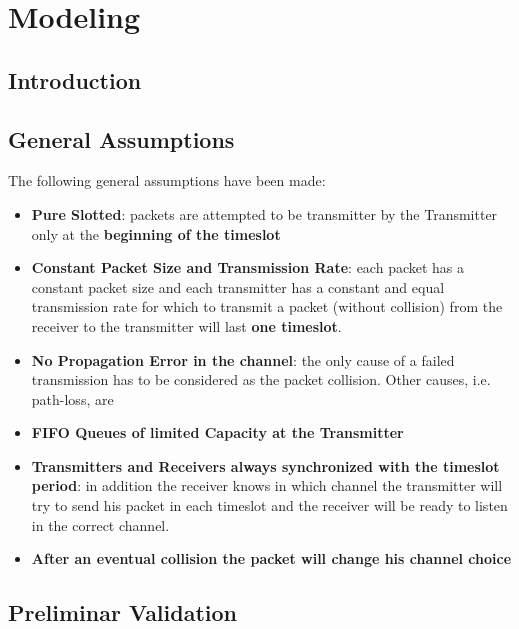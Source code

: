 \section{Modeling}
\subsection{Introduction}

\subsection{General Assumptions}
The following general assumptions have been made:
\begin{itemize}
	\item \textbf{Pure Slotted}: packets are attempted to be transmitter by the Transmitter only at the \textbf{beginning of the timeslot}
	\item \textbf{Constant Packet Size and Transmission Rate}: each packet has a constant packet size and each transmitter has a constant and equal transmission rate for which to transmit a packet (without collision) from the receiver to the transmitter will last \textbf{one timeslot}.
	\item \textbf{No Propagation Error in the channel}: the only cause of a failed transmission has to be considered as the packet collision. Other causes, i.e. path-loss, are 
	\item \textbf{FIFO Queues of limited Capacity at the Transmitter} 
	\item \textbf{Transmitters and Receivers always synchronized with the timeslot period}: in addition the receiver knows in which channel the transmitter will try to send his packet in each timeslot and the receiver will be ready to listen in the correct channel.
	\item \textbf{After an eventual collision the packet will change his channel choice}
\end{itemize}

\subsection{Preliminar Validation}

